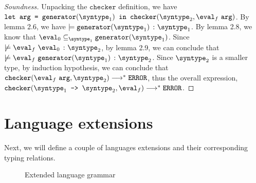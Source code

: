 \begin{proof}[Soundness]
  Unpacking the $\texttt{checker}$ definition, we have $\letin{\texttt{arg}}{\mkgen{\syntype_1}}{\mkche{\syntype_2}{\eval_f \ \texttt{arg}}}$. By lemma 2.6, we have $\models \hastype{\mkgen{\syntype_1}}{\syntype_1}$. By lemma 2.8, we know that $\eval_0 \subseteq_{\syntype_1} \mkgen{\syntype_1}$. Since $\not \models \hastype{\eval_f \ \eval_0}{\syntype_2}$, by lemma 2.9, we can conclude that $\not \models \hastype{\eval_f \ \mkgen{\syntype_1}}{\syntype_2}$. Since $\syntype_2$ is a smaller type, by induction hypothesis, we can conclude that $\mkche{\eval_f \ \texttt{arg}}{\syntype_2} \smallsteps[] \eerror$, thus the overall expression, $\mkche{\mkfun{\syntype_1}{\syntype_2}}{\eval_f} \smallsteps[] \eerror$.

\end{proof}

\section{Language extensions}

Next, we will define a couple of languages extensions and their corresponding typing relations.

\begin{figure}[hbt!]%
  \begin{grammar}
            \grule[expressions]{\expr}{
              \cdots
              \gor \vpoly
            }
            \grule[values]{\eval}{
              \cdots
              \gor \vpoly
            }
            \grule[types]{\syntype}{
              \cdots
              \gor \tpoly
              \gor \mkunion{\syntype}{\syntype}
              \gor \mkintersect{\syntype}{\syntype}
              \gor \mktset{\syntype}{\expr}
              \gor \mkdfun{\ev}{\syntype}{\syntype}
              \gor \mkmiu{\alpha}{\syntype}
          }
        \end{grammar}
    \caption{Extended language grammar}
    \label{ext_Grammar}
\end{figure}

